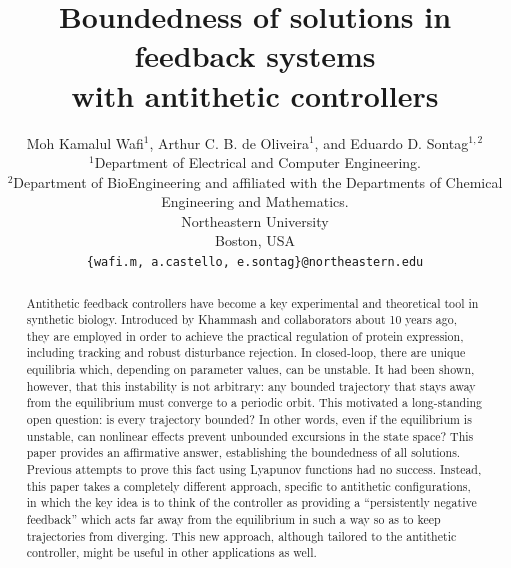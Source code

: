 \documentclass{article}
\title{
Boundedness of solutions in feedback systems \\ with antithetic controllers
}
\author{
  Moh Kamalul Wafi$^1$, Arthur C. B. de Oliveira$^1$, and Eduardo D. Sontag$^{1,2}$ \\
  $^1$Department of Electrical and Computer Engineering. \\
  $^2$Department of BioEngineering and affiliated with the Departments of Chemical Engineering and Mathematics. \\
  Northeastern University \\
  Boston, USA\\
  \texttt{\{wafi.m, a.castello, e.sontag\}@northeastern.edu}
}
\begin{document}
\maketitle

\begin{abstract}
Antithetic feedback controllers have become a key experimental and theoretical tool in synthetic biology.
Introduced by Khammash and collaborators about 10 years ago, they are employed in order to achieve the practical regulation of protein expression, including tracking and robust disturbance rejection.
In closed-loop, there are unique equilibria which, depending on parameter values, can be unstable.
It had been shown, however, that this instability is not arbitrary: any bounded trajectory that stays away from the equilibrium must converge to a periodic orbit.
This motivated a long-standing open question: is every trajectory bounded?
In other words, even if the equilibrium is unstable, can nonlinear effects prevent unbounded excursions in the state space?
This paper provides an affirmative answer, establishing the boundedness of all solutions.
Previous attempts to prove this fact using Lyapunov functions had no success.
Instead, this paper takes a completely different approach, specific to antithetic configurations, in which the key idea is to think of the controller as providing a ``persistently negative feedback'' which acts far away from the equilibrium in such a way so as to keep trajectories from diverging.
This new approach, although tailored to the antithetic controller, might be useful in other applications as well.
\end{abstract}

\end{document}
